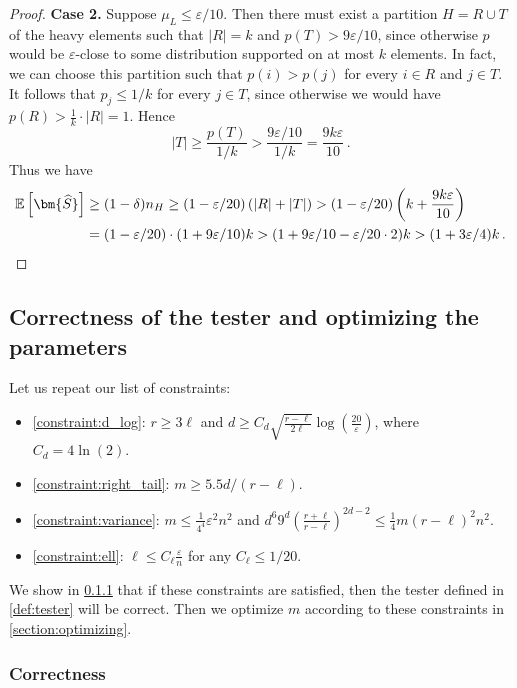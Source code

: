 \documentclass{theoretics}
\newcommand{\Ex}[1]{\bE \left[ #1 \right]}
\newcommand{\bE}{\ensuremath{\mathbb{E}}}
\renewcommand{\epsilon}{\varepsilon}
\begin{document}
\begin{proof}
    \textbf{Case 2.} Suppose $\mu_L \le \epsilon/10$. Then there must exist a partition $H = R \cup
    T$ of the heavy elements such that $|R| = k$ and $p(T) > 9\epsilon/10$, since otherwise $p$ would
    be $\epsilon$-close to some distribution supported on at most $k$ elements. In fact, we can
    choose this partition such that $p(i) > p(j)$ for every $i \in R$ and $j \in T$. It follows that
    $p_j \le 1/k$ for every $j \in T$, since otherwise we would have $p(R) > \frac{1}{k} \cdot |R| =
    1$. Hence
    \[
        |T| \ge \frac{p(T)}{1/k} > \frac{9\epsilon/10}{1/k} = \frac{9 k \epsilon}{10} \,.
    \]
    Thus we have
    \begin{align*}
        \Ex{\bm{\widehat S}}
        &\ge (1-\delta) n_H
        \ge (1-\epsilon/20) \left( |R| + |T| \right)
        > (1-\epsilon/20) \left( k + \frac{9 k \epsilon}{10} \right) \\
        &= (1-\epsilon/20) \cdot (1 + 9\epsilon/10) k
        > (1 + 9\epsilon/10 - \epsilon/20 \cdot 2) k
        > (1 + 3\epsilon/4) k \,. \qedhere
    \end{align*}
\end{proof}

\subsection{Correctness of the tester and optimizing the parameters}
\label{section:correctness_and_parameters}

Let us repeat our list of constraints:
\begin{itemize}
\item \cref{constraint:d_log}: $r \ge 3\ell$ and
    $d \geq C_d \sqrt{\frac{r-\ell}{2\ell}} \log \left(\frac{20}{\epsilon} \right)$, where $C_d =
    4\ln(2)$.
\item \cref{constraint:right_tail}: $m \geq 5.5 d/(r-\ell)$.
\item \cref{constraint:variance}:
    $m \leq \tfrac{1}{4^4} \epsilon^2 n^2$ and
    $d^6 9^d \left(\frac{r+\ell}{r-\ell}\right)^{2d-2} \leq \tfrac{1}{4} m(r-\ell)^2 n^2$.
\item \cref{constraint:ell}: $\ell \leq C_\ell \frac{\epsilon}{n}$ for any $C_\ell \leq 1/20$.
\end{itemize}
We show in \cref{section:correctness} that if these constraints are satisfied, then the tester defined in \cref{def:tester}
will be correct. Then we optimize $m$ according to these constraints in \cref{section:optimizing}.


\subsubsection{Correctness}
\label{section:correctness}
\end{document}
